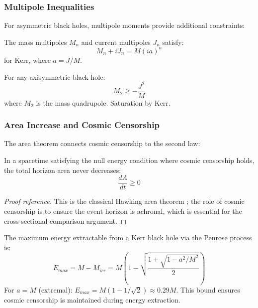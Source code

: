 \subsubsection{Multipole Inequalities}

For asymmetric black holes, multipole moments provide additional constraints:

\begin{definition}
The mass multipoles $M_n$ and current multipoles $J_n$ satisfy:
\begin{equation}
M_n + iJ_n = M(ia)^n
\end{equation}
for Kerr, where $a = J/M$.
\end{definition}

\begin{conjecture}
For any axisymmetric black hole:
\begin{equation}
M_2 \geq -\frac{J^2}{M}
\end{equation}
where $M_2$ is the mass quadrupole. Saturation by Kerr.
\end{conjecture}

\subsubsection{Area Increase and Cosmic Censorship}

The area theorem connects cosmic censorship to the second law:

\begin{theorem}\label{thm:hawking-area}
In a spacetime satisfying the null energy condition where cosmic censorship holds, the total horizon area never decreases:
\begin{equation}
\frac{dA}{dt} \geq 0
\end{equation}
\end{theorem}
\begin{proof}[Proof reference]
This is the classical Hawking area theorem \cite{hawking1971}; the role of cosmic censorship is to ensure the event horizon is achronal, which is essential for the cross-sectional comparison argument.
\end{proof}

\begin{remark}
The maximum energy extractable from a Kerr black hole via the Penrose process is:
\begin{equation}
E_{max} = M - M_{irr} = M\left(1 - \sqrt{\frac{1 + \sqrt{1 - a^2/M^2}}{2}}\right)
\end{equation}
For $a = M$ (extremal): $E_{max} = M(1 - 1/\sqrt{2}) \approx 0.29M$. This bound ensures cosmic censorship is maintained during energy extraction.
\end{remark}

